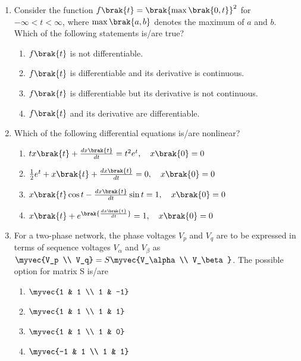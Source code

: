 \documentclass[journal,12pt,onecolumn]{IEEEtran}
\theoremstyle{remark}
\begin{document}
\begin{enumerate}[start=1, label=Q.\arabic*]
    \item Consider the function $f\brak{t} = \brak{\max\brak{0, t}}^2$ for $-\infty < t < \infty$, where $\max\brak{a, b}$ denotes the maximum of $a$ and $b$. Which of the following statements is/are true?
    \begin{enumerate}
        \item $f\brak{t}$ is not differentiable.
        \item $f\brak{t}$ is differentiable and its derivative is continuous.
        \item $f\brak{t}$ is differentiable but its derivative is not continuous.
        \item $f\brak{t}$ and its derivative are differentiable.
    \end{enumerate}

    \hfill{}

   \item Which of the following differential equations is/are nonlinear?
    \begin{enumerate}
        \item $t x\brak{t} + \frac{dx\brak{t}}{dt} = t^2e^t, \quad x\brak{0} = 0$
        \item $\frac{1}{2}e^t + x\brak{t} + \frac{dx\brak{t}}{dt} = 0, \quad x\brak{0} = 0$
        \item $x\brak{t}\cos t - \frac{dx\brak{t}}{dt}\sin t = 1, \quad x\brak{0} = 0$
        \item $x\brak{t} + e^{\brak{\frac{dx\brak{t}}{dt}}} = 1, \quad x\brak{0} = 0$
    \end{enumerate}
    \hfill{}

    \item For a two-phase network, the phase voltages $V_p$ and $V_q$ are to be expressed in terms of sequence voltages $V_\alpha$ and $V_\beta$ as $\myvec{V_p \\ V_q} = S \myvec{V_\alpha \\ V_\beta}$. The possible option for matrix S is/are
    \begin{enumerate}
        \item $\myvec{1 & 1 \\ 1 & -1}$
        \item $\myvec{1 & 1 \\ 1 & 1}$
        \item $\myvec{1 & 1 \\ 1 & 0}$
        \item $\myvec{-1 & 1 \\ 1 & 1}$
    \end{enumerate}



\end{enumerate}
\end{document}
